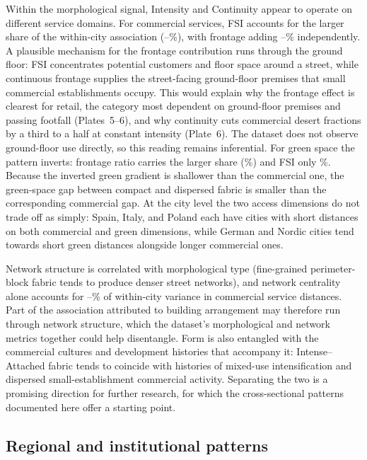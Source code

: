 \documentclass[review,authoryear]{elsarticle}
\begin{document}
Within the morphological signal, Intensity and Continuity appear to operate on different service domains. For commercial services, FSI accounts for the larger share of the within-city association (\mFSIshareMin--\mFSIshareMax\%), with frontage adding \mContshareMin--\mContshareMax\% independently. A plausible mechanism for the frontage contribution runs through the ground floor: FSI concentrates potential customers and floor space around a street, while continuous frontage supplies the street-facing ground-floor premises that small commercial establishments occupy. This would explain why the frontage effect is clearest for retail, the category most dependent on ground-floor premises and passing footfall (Plates~5--6), and why continuity cuts commercial desert fractions by a third to a half at constant intensity (Plate~6). The dataset does not observe ground-floor use directly, so this reading remains inferential. For green space the pattern inverts: frontage ratio carries the larger share (\mContGreenShare\%) and FSI only \mFSIGreenShare\%. Because the inverted green gradient is shallower than the commercial one, the green-space gap between compact and dispersed fabric is smaller than the corresponding commercial gap. At the city level the two access dimensions do not trade off as simply: Spain, Italy, and Poland each have cities with short distances on both commercial and green dimensions, while German and Nordic cities tend towards short green distances alongside longer commercial ones.

Network structure is correlated with morphological type (fine-grained perimeter-block fabric tends to produce denser street networks), and network centrality alone accounts for \mNetworkRsqMin--\mNetworkRsqMax\% of within-city variance in commercial service distances. Part of the association attributed to building arrangement may therefore run through network structure, which the dataset's morphological and network metrics together could help disentangle. Form is also entangled with the commercial cultures and development histories that accompany it: Intense--Attached fabric tends to coincide with histories of mixed-use intensification and dispersed small-establishment commercial activity. Separating the two is a promising direction for further research, for which the cross-sectional patterns documented here offer a starting point.

\subsection{Regional and institutional patterns}
\end{document}
